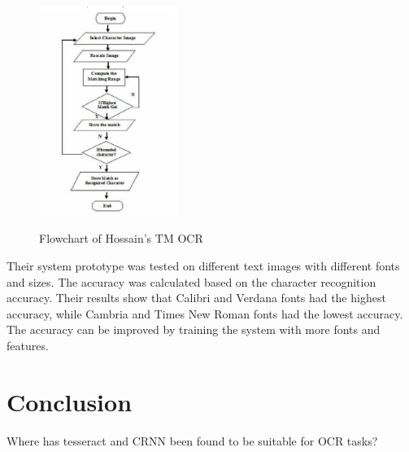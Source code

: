 \begin{figure}[ht]
    \centering
    \includegraphics[width=0.4\textwidth]{Figures/TM_Hossain.jpg}
    \caption[Flowchart of Template Matching OCR]{Flowchart of Hossain's TM OCR}\cite{hossainOpticalCharacterRecognition2019}
    \label{fig:Hossain OCR Template Matching Paper}
\end{figure}

Their system prototype was tested on different text images with different fonts and sizes. The accuracy was calculated based on the character recognition accuracy. Their results show that Calibri and Verdana fonts had the highest accuracy, while Cambria and Times New Roman fonts had the lowest accuracy.  The accuracy can be improved by training the system with more fonts and features. \cite{hossainOpticalCharacterRecognition2019}

\newpage
\section{Conclusion}

Where has tesseract and CRNN been found to be suitable for OCR tasks?